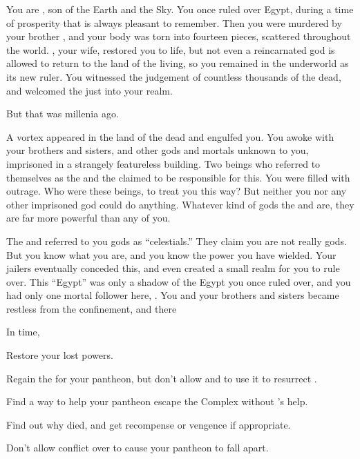 \documentclass[char]{guardians}
\begin{document}
\name{\cOsiris{}}

You are \cOsiris{}, son of the Earth and the Sky. You once ruled over Egypt, during a time of prosperity that is always pleasant to remember. Then you were murdered by your brother \cSet{}, and your body was torn into fourteen pieces, scattered throughout the world. \cIsis{}, your wife, restored you to life, but not even a reincarnated god is allowed to return to the land of the living, so you remained in the underworld as its new ruler. You witnessed the judgement of countless thousands of the dead, and welcomed the just into your realm.

But that was millenia ago.

A vortex appeared in the land of the dead and engulfed you. You awoke with your brothers and sisters, and other gods and mortals unknown to you, imprisoned in a strangely featureless building. Two beings who referred to themselves as the \cCaretaker{} and the \cWarden{} claimed to be responsible for this. You were filled with outrage. Who were these beings, to treat you this way? But neither you nor any other imprisoned god could do anything. Whatever kind of gods the \cCaretaker{} and \cWarden{} are, they are far more powerful than any of you.

The \cCaretaker{} and \cWarden{} referred to you gods as ``celestials.'' They claim you are not really gods. But you know what you are, and you know the power you have wielded. Your jailers eventually conceded this, and even created a small realm for you to rule over. This ``Egypt'' was only a shadow of the Egypt you once ruled over, and you had only one mortal follower here, \cEgyptianHuman{}. You and your brothers and sisters became restless from the confinement, and there

In time,






\begin{itemz}[Goals]
  \item Restore your lost powers.
  \item Regain the \iNecro{} for your pantheon, but don't allow \cIsis{} and \cAnubis{} to use it to resurrect \cSet{}.
  \item Find a way to help your pantheon escape the Complex without \cSet{}'s help.
  \item Find out why \cEgyptianHuman{} died, and get recompense or vengence if appropriate.
  \item Don't allow conflict over \cEgyptianHuman{} to cause your pantheon to fall apart.
\end{itemz}

\begin{contacts}
  \contact{\cIsis{}}
  \contact{\cAnubis{}}
  \contact{\cHel{}}
  \contact{\cCaretaker{}}
  \contact{\cWarden{}}
\end{contacts}
\end{document}
